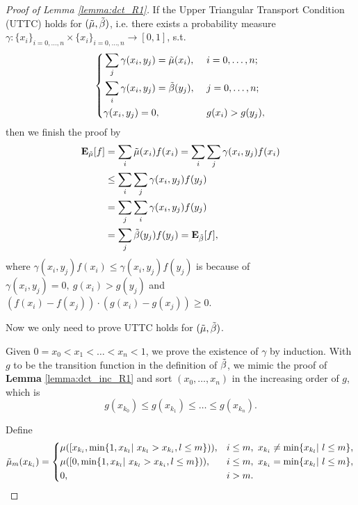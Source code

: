 \documentclass[nohyperref]{article}
\theoremstyle{plain}
\begin{document}
\begin{proof}[Proof of Lemma \ref{lemma:dct_R1}]

If the Upper Triangular Transport Condition (UTTC) holds for $(\Tilde{\mu}, \Tilde{\beta})$, i.e. there exists a probability measure $\gamma: \{x_i\}_{i=0,\dots, n} \times \{x_i\}_{i=0,\dots, n} \rightarrow [0, 1]$, s.t. 
\begin{equation*}
    \left\{
    \begin{aligned}
        &\sum_j \gamma (x_i, y_j) = \Tilde{\mu} (x_i),& &\ i = 0, \dots, n; \\
        &\sum_i \gamma (x_i, y_j) = \Tilde{\beta} (y_j),& &\ j = 0, \dots, n; \\
        &\gamma (x_i, y_j) = 0,& &\ g(x_i) > g(y_j), \\
    \end{aligned}
    \right.
\end{equation*}
then we finish the proof by
\begin{equation*}
    \begin{aligned}
        \textbf{E}_{\Tilde{\mu}} [f] 
        &= \sum_i \Tilde{\mu} (x_i) f(x_i) 
        = \sum_i \sum_j \gamma (x_i, y_j) f(x_i) \\
        &\leq \sum_i \sum_j \gamma (x_i, y_j) f(y_j) \\
        &= \sum_j \sum_i \gamma (x_i, y_j) f(y_j) \\
        &= \sum_j \Tilde{\beta} (y_j) f(y_j) 
        = \textbf{E}_{\Tilde{\beta}} [f], \\
    \end{aligned}
\end{equation*}
where $\gamma (x_i, y_j) f(x_i) \leq \gamma (x_i, y_j) f(y_j)$ is because of $\gamma (x_i, y_j) = 0, \ g(x_i) > g(y_j)$ and $(f(x_i) - f(x_j)) \cdot (g(x_i) - g(x_j)) \geq 0$.

Now we only need to prove UTTC holds for $(\Tilde{\mu}, \Tilde{\beta})$.

Given $0 = x_0 < x_1 < \dots < x_n < 1$, we prove the existence of $\gamma$ by induction.
With $g$ to be the transition function in the definition of $\Tilde{\beta}$, we mimic the proof of \textbf{Lemma} \ref{lemma:dct_inc_R1} and sort $(x_0, \dots, x_n)$ in the increasing order of $g$,
which is 
$$g(x_{k_0}) \leq g(x_{k_1}) \leq \dots \leq g(x_{k_n}).$$

Define 
\begin{equation*}
    \Tilde{\mu}_m(x_{k_i}) = 
    \left\{
    \begin{aligned}
        &\mu ([x_{k_i}, \min\{1, x_{k_l} |\ x_{k_l} > x_{k_i}, l \leq m \})),& &i \leq m,\  
        x_{k_i} \neq \min\{x_{k_l} |\ l \leq m \}, \\
        &\mu ([0, \min\{1, x_{k_l} |\ x_{k_l} > x_{k_i}, l \leq m \})),& &i \leq m,\  
        x_{k_i} = \min\{x_{k_l} |\ l \leq m \}, \\
        & 0,& &i > m.
    \end{aligned}
    \right.
\end{equation*}


\end{proof}
\end{document}
